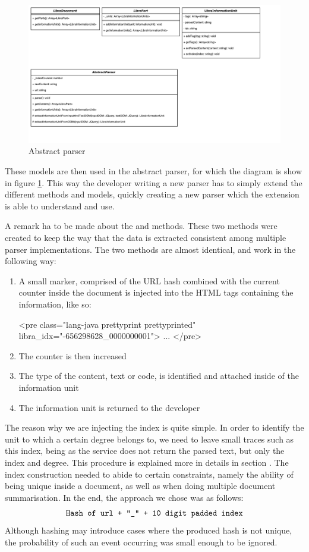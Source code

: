 \begin{figure}[H]
\centering
\includegraphics[scale=0.5]{Figures/AbstractParserUML}
\caption{Abstract parser}
\label{fig:abstractParserDiagram}
\end{figure}

These models are then used in the abstract parser, for which the diagram is show in figure \ref{fig:abstractParserDiagram}. This way the developer writing a new parser has to simply extend the different methods and models, quickly creating a new parser which the extension is able to understand and use. 

A remark ha to be made about the  and  methods. These two methods were created to keep the way that the data is extracted consistent among multiple parser implementations. The two methods are almost identical, and work in the following way:

\begin{enumerate}
	\item A small marker, comprised of the URL hash combined with the current counter inside the document is injected into the HTML tags containing the information, like so:
\begin{htmlcode}
<pre class="lang-java prettyprint prettyprinted" libra_idx="-656298628_0000000001">
    ...
</pre>
\end{htmlcode}
\item The counter is then increased
\item The type of the content, text or code, is identified and attached inside of the information unit
\item The information unit is returned to the developer
\end{enumerate}
The reason why we are injecting the index is quite simple. In order to identify the unit to which a certain degree belongs to, we need to leave small traces such as this index, being as the service does not return the parsed text, but only the index and degree. This procedure is explained more in details in section . The index construction needed to abide to certain constraints, namely the ability of being unique inside a document, as well as when doing multiple document summarisation. In the end, the approach we chose was as follows:
\[
\text{\texttt{Hash of url + "\_" + 10 digit padded index}}
\]
Although hashing may introduce cases where the produced hash is not unique, the probability of such an event occurring was small enough to be ignored.


